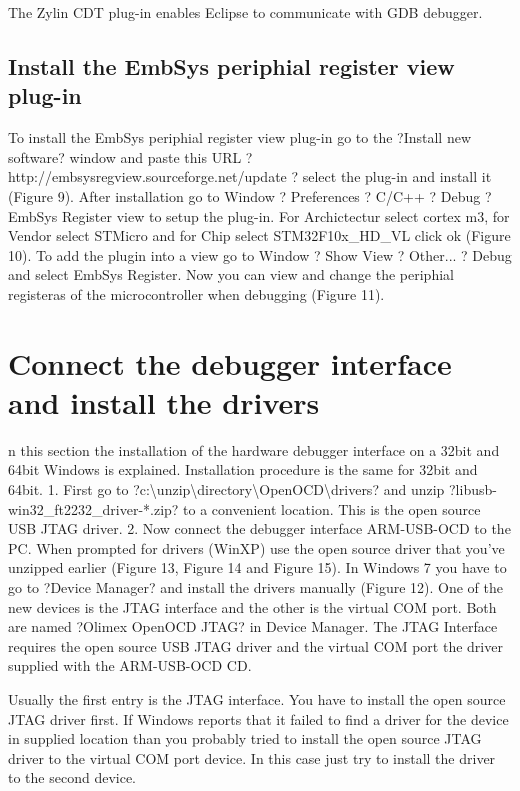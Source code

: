 \documentclass[12pt,a4paper]{article}
\begin{document}
The Zylin CDT plug-in enables Eclipse to communicate with GDB debugger.

\subsection{Install the EmbSys periphial register view plug-in}
To install the EmbSys periphial register view plug-in go to the  ?Install new software? window and paste this URL ? http://embsysregview.sourceforge.net/update ? select the plug-in and install it (Figure 9).
After installation go to Window ? Preferences ? C/C++ ? Debug ? EmbSys Register view to setup the plug-in. For Archictectur select cortex m3, for Vendor select STMicro and for Chip select STM32F10x\_HD\_VL click ok (Figure 10). To add the plugin into a view go to Window ? Show View ? Other... ? Debug and select EmbSys Register.  Now you can view and change the periphial registeras of the microcontroller when debugging (Figure 11).

\section{Connect the debugger interface and install the drivers}
n this section the installation of the hardware debugger interface on a 32bit and 64bit Windows is explained. Installation procedure is the same for 32bit and 64bit.
1. First go to ?c:\textbackslash unzip\textbackslash directory\textbackslash OpenOCD\textbackslash drivers? and unzip ?libusb-win32\_ft2232\_driver-*.zip? to a convenient location. This is the open source USB JTAG driver.
2. Now connect the debugger interface ARM-USB-OCD to the PC. When prompted for drivers (WinXP) use the open source driver that you've unzipped earlier (Figure 13, Figure 14 and Figure 15). In Windows 7 you have to go to ?Device Manager? and install the drivers manually (Figure 12). 
One of the new devices is the JTAG interface and the other is the virtual COM port. Both are named ?Olimex OpenOCD JTAG? in  Device Manager. The JTAG Interface requires the open source USB JTAG driver and the virtual COM port the driver supplied with the  ARM-USB-OCD CD.

Usually the first entry is the JTAG interface. You have to install the open source JTAG driver first. If Windows reports that it failed to find a driver for the device in supplied location than you probably tried to install the open source JTAG driver to the virtual COM port device. In this case just try to install the driver to the second device.
\end{document}
